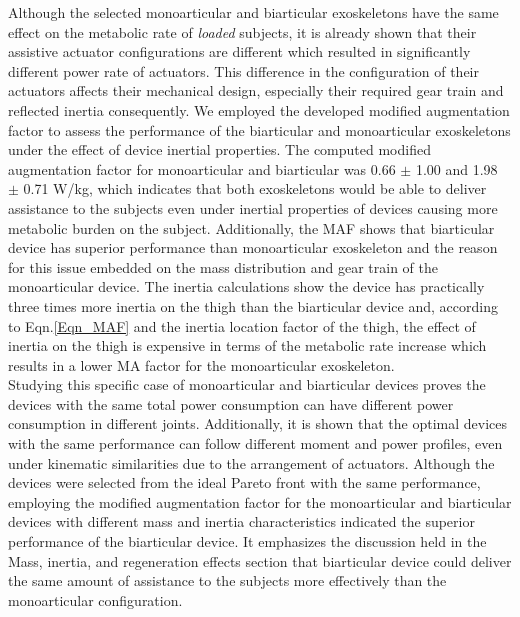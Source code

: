\documentclass[10pt,letterpaper]{article}
\begin{document}
Although the selected monoarticular and biarticular exoskeletons have the same effect on the metabolic rate of {\it loaded} subjects, it is already shown that their assistive actuator configurations are different which resulted in significantly different power rate of actuators. This difference in the configuration of their actuators affects their mechanical design, especially their required gear train and reflected inertia consequently. We employed the developed modified augmentation factor to assess the performance of the biarticular and monoarticular exoskeletons under the effect of device inertial properties. The computed modified augmentation factor for monoarticular and biarticular was 0.66 $\pm$ 1.00 and  1.98 $\pm$ 0.71 W/kg, which indicates that both exoskeletons would be able to deliver assistance to the subjects even under inertial properties of devices causing more metabolic burden on the subject. Additionally, the MAF shows that biarticular device has superior performance than monoarticular exoskeleton and the reason for this issue embedded on the mass distribution and gear train of the monoarticular device. The inertia calculations show the device has practically three times more inertia on the thigh than the biarticular device and, according to Eqn.\eqref{Eqn_MAF} and the inertia location factor of the thigh, the effect of inertia on the thigh is expensive in terms of the metabolic rate increase which results in a lower MA factor for the monoarticular exoskeleton.\\
Studying this specific case of monoarticular and biarticular devices proves the devices with the same total power consumption can have different power consumption in different joints. Additionally, it is shown that the optimal devices with the same performance can follow different moment and power profiles, even under kinematic similarities due to the arrangement of actuators. Although the devices were selected from the ideal Pareto front with the same performance, employing the modified augmentation factor for the monoarticular and biarticular devices with different mass and inertia characteristics indicated the superior performance of the biarticular device. It emphasizes the discussion held in the Mass, inertia, and regeneration effects section that biarticular device could deliver the same amount of assistance to the subjects more effectively than the monoarticular configuration.\\
\end{document}
